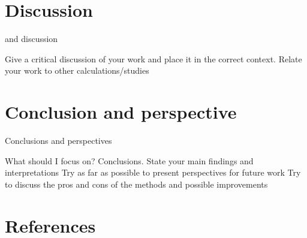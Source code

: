 \documentclass{article}
\begin{document}
\vspace{1cm}

\clearpage
\newpage

\section{Discussion} \label{sec:Discussion}

 and discussion


 Give a critical discussion of your work and place it in the correct context.
 Relate your work to other calculations/studies

\vspace{1cm}

\section{Conclusion and perspective} \label{sec:Conclusion}

Conclusions and perspectives


What should I focus on? Conclusions.
State your main findings and interpretations
Try as far as possible to present perspectives for future work
Try to discuss the pros and cons of the methods and possible improvements


\vspace{1cm}

\section{References} \label{sec:References}

\end{document}
